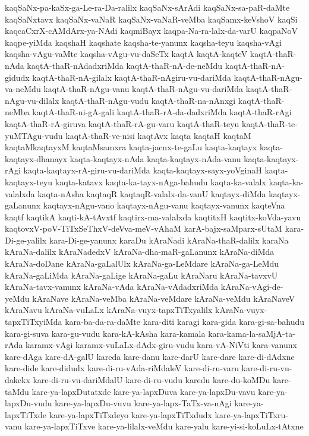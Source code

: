 {kaqSaNx-pa-kaSx-ga-Le-ra-Da-ralilx
kaqSaNx-sArAdi
kaqSaNx-sa-paR-daMte
kaqSaNxtavx
kaqSaNx-vaNaR
kaqSaNx-vaNaR-veMba
kaqSamx-keVshoV
kaqSi
kaqcaCxrX-cAMdArx-ya-NAdi
kaqmiBayx
kaqpa-Na-ra-lalx-da-varU
kaqpaNoV
kaqpe-yiMda
kaqshaH
kaqshate
kaqsha-te-yanunx
kaqsha-teyu
kaqsha-vAgi
kaqsha-vAgu-vaMte
kaqsha-vAgu-vu-daSeTx
kaqtA
kaqtA-kaqteV
kaqtA-thaR-nAda
kaqtA-thaR-nAdadxriMda
kaqtA-thaR-nA-de-neMdu
kaqtA-thaR-nA-gidudx
kaqtA-thaR-nA-gilalx
kaqtA-thaR-nAgiru-vu-dariMda
kaqtA-thaR-nAgu-va-neMdu
kaqtA-thaR-nAgu-vanu
kaqtA-thaR-nAgu-vu-dariMda
kaqtA-thaR-nAgu-vu-dilalx
kaqtA-thaR-nAgu-vudu
kaqtA-thaR-na-nAnxgi
kaqtA-thaR-neMba
kaqtA-thaR-ni-gA-gali
kaqtA-thaR-rA-da-dadxriMda
kaqtA-thaR-rAgi
kaqtA-thaR-rA-giruva
kaqtA-thaR-rA-gu-varu
kaqtA-thaR-teyu
kaqtA-thaR-te-yuMTAgu-vudu
kaqtA-thaR-ve-nisi
kaqtAvx
kaqta
kaqtaH
kaqtaM
kaqtaMkaqtayxM
kaqtaMsamxra
kaqta-jacnx-te-gaLu
kaqta-kaqtayx
kaqta-kaqtayx-dhanayx
kaqta-kaqtayx-nAda
kaqta-kaqtayx-nAda-vanu
kaqta-kaqtayx-rAgi
kaqta-kaqtayx-rA-giru-vu-dariMda
kaqta-kaqtayx-sayx-yoVginaH
kaqta-kaqtayx-teyu
kaqta-katavx
kaqta-ka-tayx-nAga-bahudu
kaqta-ka-valalx
kaqta-ka-valalxda
kaqta-nAsha
kaqtaqR
kaqtaqR-valalx-da-vanU
kaqtayx-diMda
kaqtayx-gaLanunx
kaqtayx-nAgu-vano
kaqtayx-nAgu-vanu
kaqtayx-vanunx
kaqteVna
kaqtf
kaqtikA
kaqti-kA-tAvxtf
kaqtirx-ma-valalxda
kaqtitxH
kaqtitx-koVda-yavu
kaqtovxV-poV-TiTxSeThxV-deVva-meV-vAhaM
karA-bajx-saMparx-sUtaM
kara-Di-ge-yalilx
kara-Di-ge-yanunx
karaDu
kAraNadi
kAraNa-thaR-dalilx
karaNa
kAraNa-dalilx
kAraNadedxV
kAraNa-dha-maR-gaLanunx
kAraNa-diMda
kAraNa-doDane
kAraNa-gaLalUlx
kAraNa-ga-LeMdare
kAraNa-ga-LeMdu
kAraNa-gaLiMda
kAraNa-gaLige
kAraNa-gaLu
kAraNaru
kAraNa-tavxvU
kAraNa-tavx-vanunx
kAraNa-vAda
kAraNa-vAdadxriMda
kAraNa-vAgi-de-yeMdu
kAraNave
kAraNa-veMba
kAraNa-veMdare
kAraNa-veMdu
kAraNaveV
kAraNavu
kAraNa-vuLaLx
kAraNa-vuyx-tapxTiTxyalilx
kAraNa-vuyx-tapxTiTxyiMda
kara-ba-da-ra-daMte
kara-diti
karagi
kara-gida
kara-gi-sa-bahudu
kara-gi-suva
kara-gu-vudu
kara-kA-kAsha
kara-kamala
kara-kama-la-saMjA-ta-rAda
karamx-vAgi
karamx-vuLaLx-dAdx-giru-vudu
kara-vA-NiVti
kara-vanunx
kare-dAga
kare-dA-galU
kareda
kare-danu
kare-darU
kare-dare
kare-di-dAdxne
kare-dide
kare-didudx
kare-di-ru-vAda-riMdaleV
kare-di-ru-varu
kare-di-ru-vu-dakekx
kare-di-ru-vu-dariMdalU
kare-di-ru-vudu
karedu
kare-du-koMDu
kare-taMdu
kare-ya-lapxDutatxde
kare-ya-lapxDuva
kare-ya-lapxDu-vavu
kare-ya-lapxDu-vudu
kare-ya-lapxDu-vuvu
kare-ya-lapx-TaTx-va-nAgi
kare-ya-lapxTiTxde
kare-ya-lapxTiTxdeyo
kare-ya-lapxTiTxdudx
kare-ya-lapxTiTxru-vanu
kare-ya-lapxTiTxve
kare-ya-lilalx-veMdu
kare-yalu
kare-yi-si-koLuLx-tAtxne
}
